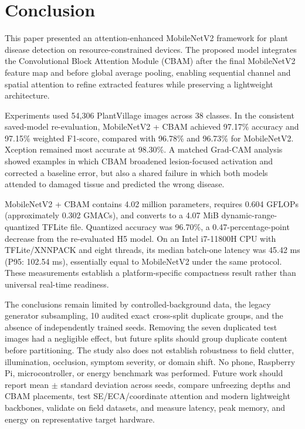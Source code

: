 \section{Conclusion}

This paper presented an attention-enhanced MobileNetV2 framework for plant disease detection on resource-constrained devices. The proposed model integrates the Convolutional Block Attention Module (CBAM) after the final MobileNetV2 feature map and before global average pooling, enabling sequential channel and spatial attention to refine extracted features while preserving a lightweight architecture.

Experiments used 54,306 PlantVillage images across 38 classes. In the consistent saved-model re-evaluation, MobileNetV2 + CBAM achieved 97.17\% accuracy and 97.15\% weighted F1-score, compared with 96.78\% and 96.73\% for MobileNetV2. Xception remained most accurate at 98.30\%. A matched Grad-CAM analysis showed examples in which CBAM broadened lesion-focused activation and corrected a baseline error, but also a shared failure in which both models attended to damaged tissue and predicted the wrong disease.

MobileNetV2 + CBAM contains 4.02 million parameters, requires 0.604 GFLOPs (approximately 0.302 GMACs), and converts to a 4.07 MiB dynamic-range-quantized TFLite file. Quantized accuracy was 96.70\%, a 0.47-percentage-point decrease from the re-evaluated H5 model. On an Intel i7-11800H CPU with TFLite/XNNPACK and eight threads, its median batch-one latency was 45.42 ms (P95: 102.54 ms), essentially equal to MobileNetV2 under the same protocol. These measurements establish a platform-specific compactness result rather than universal real-time readiness.

The conclusions remain limited by controlled-background data, the legacy generator subsampling, 10 audited exact cross-split duplicate groups, and the absence of independently trained seeds. Removing the seven duplicated test images had a negligible effect, but future splits should group duplicate content before partitioning. The study also does not establish robustness to field clutter, illumination, occlusion, symptom severity, or domain shift. No phone, Raspberry Pi, microcontroller, or energy benchmark was performed. Future work should report mean $\pm$ standard deviation across seeds, compare unfreezing depths and CBAM placements, test SE/ECA/coordinate attention and modern lightweight backbones, validate on field datasets, and measure latency, peak memory, and energy on representative target hardware.
